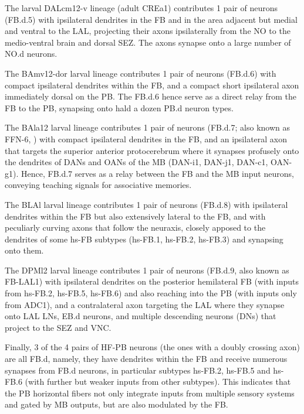     The larval DALcm12-v lineage (adult CREa1) contributes 1 pair of neurons (FB.d.5) with ipsilateral dendrites in the FB and in the area adjacent but medial and ventral to the LAL, projecting their axons ipsilaterally from the NO to the medio-ventral brain and dorsal SEZ. The axons synapse onto a large number of NO.d neurons.

    The BAmv12-dor larval lineage contributes 1 pair of neurons (FB.d.6) with compact ipsilateral dendrites within the FB, and a compact short ipsilateral axon immediately dorsal on the PB. The FB.d.6 hence serve as a direct relay from the FB to the PB, synapsing onto hald a dozen PB.d neuron types.

    The BAla12 larval lineage contributes 1 pair of neurons (FB.d.7; also known as FFN-6, \citep{eschbach2021circuits}) with compact ipsilateral dendrites in the FB, and an ipsilateral axon that targets the superior anterior protocerebrum where it synapses profusely onto the dendrites of DANs and OANs of the MB (DAN-i1, DAN-j1, DAN-c1, OAN-g1). Hence, FB.d.7 serves as a relay between the FB and the MB input neurons, conveying teaching signals for associative memories.

    The BLAl larval lineage contributes 1 pair of neurons (FB.d.8) with ipsilateral dendrites within the FB but also extensively lateral to the FB, and with peculiarly curving axons that follow the neuraxis, closely apposed to the dendrites of some hs-FB subtypes (hs-FB.1, hs-FB.2, hs-FB.3) and synapsing onto them.

    The DPMl2 larval lineage contributes 1 pair of neurons (FB.d.9, also known as FB-LAL1) with ipsilateral dendrites on the posterior  hemilateral FB (with inputs from hs-FB.2, hs-FB.5, hs-FB.6) and also reaching into the PB (with inputs only from ADC1), and a contralateral axon targeting the LAL where they synapse onto LAL LNs, EB.d neurons, and multiple descending neurons (DNs) that project to the SEZ and VNC.

    Finally, 3 of the 4 pairs of HF-PB neurons (the ones with a doubly crossing axon) are all FB.d, namely, they have dendrites within the FB and receive numerous synapses from FB.d neurons, in particular subtypes hs-FB.2, hs-FB.5 and hs-FB.6 (with further but weaker inputs from other subtypes). This indicates that the PB horizontal fibers not only integrate inputs from multiple sensory systems and gated by MB outputs, but are also modulated by the FB.


